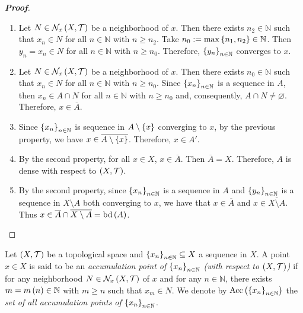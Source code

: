 \begin{proposition}
  \begin{proof}[\rm\textbf{Proof}]
    \hfill
    \begin{enumerate}
      \item Let $N\in\mathcal{N}_x\left(X,\mathcal{T}\right)$ be a neighborhood of $x$. Then there exists $n_2\in\mathbb{N}$ such that $x_n\in N$ for all $n\in\mathbb{N}$ with $n\geq n_2$. Take $n_0:=\max\left\{n_1,n_2\right\}\in\mathbb{N}$. Then $y_n=x_n\in N$ for all $n\in\mathbb{N}$ with $n\geq n_0$. Therefore, $\left\{y_n\right\}_{n\in\mathbb{N}}$ converges to $x$.
      \item Let $N\in\mathcal{N}_x\left(X,\mathcal{T}\right)$ be a neighborhood of $x$. Then there exists $n_0\in\mathbb{N}$ such that $x_n\in N$ for all $n\in\mathbb{N}$ with $n\geq n_0$. Since $\left\{x_n\right\}_{n\in\mathbb{N}}$ is a sequence in $A$, then $x_n\in A\cap N$ for all $n\in\mathbb{N}$ with $n\geq n_0$ and, consequently, $A\cap N\neq\varnothing$. Therefore, $x\in\overline{A}$.
      \item Since $\left\{x_n\right\}_{n\in\mathbb{N}}$ is sequence in $A\setminus\left\{x\right\}$ converging to $x$, by the previous property, we have $x\in\overline{A\setminus\left\{x\right\}}$. Therefore, $x\in A'$.
      \item By the second property, for all $x\in X$, $x\in\overline{A}$. Then $\overline{A}=X$. Therefore, $A$ is dense with respect to $\left(X,\mathcal{T}\right)$.
      \item By the second property, since $\left\{x_n\right\}_{n\in\mathbb{N}}$ is a sequence in $A$ and $\left\{y_n\right\}_{n\in\mathbb{N}}$ is a sequence in $X\setminus A$ both converging to $x$, we have that $x\in\overline{A}$ and $x\in\overline{X\setminus A}$. Thus $x\in\overline{A}\cap\overline{X\setminus A}=\operatorname{bd}\left(A\right)$.
    \end{enumerate}
  \end{proof}
\end{proposition}

\begin{definition}
  Let $\left(X,\mathcal{T}\right)$ be a topological space and $\left\{x_n\right\}_{n\in\mathbb{N}}\subseteq X$ a sequence in $X$. A point $x\in X$ is said to be an \textit{accumulation point of $\left\{x_n\right\}_{n\in\mathbb{N}}$ (with respect to $\left(X,\mathcal{T}\right)$)} if for any neighborhood $N\in\mathcal{N}_x\left(X,\mathcal{T}\right)$ of $x$ and for any $n\in\mathbb{N}$, there exists $m=m\left(n\right)\in\mathbb{N}$ with $m\geq n$ such that $x_m\in N$. We denote by $\text{Acc}\left(\left\{x_n\right\}_{n\in\mathbb{N}}\right)$ the \textit{set of all accumulation points of $\left\{x_n\right\}_{n\in\mathbb{N}}$}.
\end{definition}

